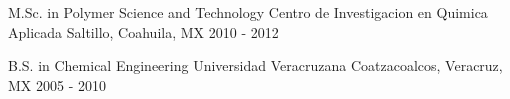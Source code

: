 


\begin{cventries}


\eduentry
{M.Sc. in Polymer Science and Technology} %
{Centro de Investigacion en Quimica Aplicada} %
{Saltillo, Coahuila, MX} %
{2010 - 2012} %



\eduentry
{B.S. in Chemical Engineering} %
{Universidad Veracruzana} %
{Coatzacoalcos, Veracruz, MX} %
{2005 - 2010} %


\end{cventries}